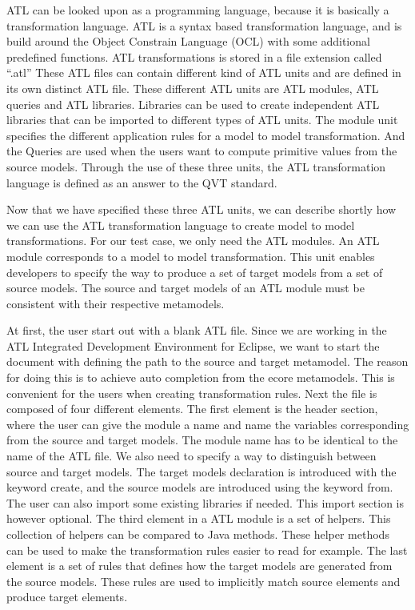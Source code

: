 \documentclass[pdftex,11pt,a4paper]{article}
\begin{document}
\noindent ATL can be looked upon as a programming language, because it is
basically a transformation language. ATL is a syntax based transformation
language, and is build around the Object Constrain Language (OCL) \cite{OCL}
with some additional predefined functions. ATL transformations is stored in a
file extension called ``.atl'' These ATL files can contain different kind of
ATL units and are defined in its own distinct ATL file. These different ATL
units are ATL modules, ATL queries and ATL libraries. Libraries can be used to
create independent ATL libraries that can be imported to different types of ATL
units. The module unit specifies the different application rules for a model to
model transformation. And the Queries are used when the users want to compute
primitive values from the source models. Through the use of these three units,
the ATL transformation language is defined as an answer to the QVT\cite{QVT}
standard.

Now that we have specified these three ATL units, we can describe shortly how
we can use the ATL transformation language to create model to model
transformations. For our test case, we only need the ATL modules. An ATL module
corresponds to a model to model transformation. This unit enables developers to
specify the way to produce a set of target models from a set of source models.
The source and target models of an ATL module must be consistent with their
respective metamodels. 

At first, the user start out with a blank ATL file. Since we are working in
the ATL Integrated Development Environment for Eclipse, we want to start the
document with defining the path to the source and target metamodel. The
reason for doing this is to achieve auto completion from the ecore metamodels.
This is convenient for the users when creating transformation rules. Next the
file is composed of four different elements. The first element is the header
section, where the user can give the module a name and name the variables
corresponding from the source and target models. The module name has to be
identical to the name of the ATL file. We also need to specify a way to
distinguish between source and target models. The target models declaration is
introduced with the keyword create, and the source models are introduced using
the keyword from. The user can also import some existing libraries if needed.
This import section is however optional. The third element in a ATL module is a
set of helpers. This collection of helpers can be compared to Java methods.
These helper methods can be used to make the transformation rules easier to read
for example. The last element is a set of rules that defines how the target
models are generated from the source models. These rules are used to implicitly
match source elements and produce target elements. 
\end{document}
